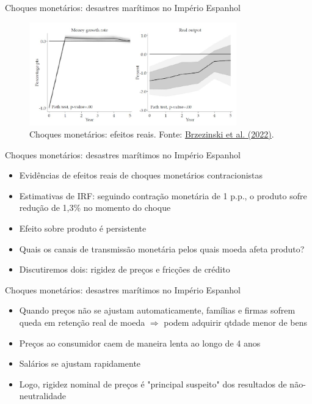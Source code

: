 \documentclass[10pt]{beamer}
\begin{document}
\begin{frame}
    {Choques monetários: desastres marítimos no Império Espanhol}
    \begin{figure}
        \centering
        \includegraphics[width=0.8\textwidth]{./figures/aula3_fig7}
        \caption{Choques monetários: efeitos reais. Fonte: \href{https://cepr.org/publications/dp14089}{Brzezinski et al. (2022)}.}
        \label{aula3_fig7}
    \end{figure}
\end{frame}

\begin{frame}
    {Choques monetários: desastres marítimos no Império Espanhol}
    \begin{itemize}
        \item Evidências de efeitos reais de choques monetários contracionistas\bigskip
        \item Estimativas de IRF: seguindo contração monetária de 1 p.p., o produto sofre redução de 1,3\% no momento do choque\bigskip
        \item Efeito sobre produto é persistente\bigskip
        \item Quais os canais de transmissão monetária pelos quais moeda afeta produto?\bigskip
        \item Discutiremos dois: rigidez de preços e fricções de crédito
    \end{itemize}
\end{frame}

\begin{frame}
    {Choques monetários: desastres marítimos no Império Espanhol}
    \begin{itemize}
        \item Quando preços não se ajustam automaticamente, famílias e firmas sofrem queda em retenção real de moeda $\Rightarrow$ podem adquirir qtdade menor de bens\bigskip
        \item Preços ao consumidor caem de maneira lenta ao longo de 4 anos\bigskip
        \item Salários se ajustam rapidamente\bigskip
        \item Logo, rigidez nominal de preços é "principal suspeito" dos resultados de não-neutralidade
    \end{itemize}
\end{frame}
\end{document}

